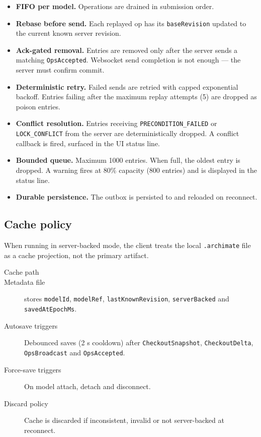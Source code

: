 \begin{itemize}
\item \textbf{FIFO per model.} Operations are drained in submission order.
\item \textbf{Rebase before send.} Each replayed op has its
  \texttt{baseRevision} updated to the current known server revision.
\item \textbf{Ack-gated removal.} Entries are removed only after the server
  sends a matching \texttt{OpsAccepted}. Websocket send completion is not
  enough --- the server must confirm commit.
\item \textbf{Deterministic retry.} Failed sends are retried with capped
  exponential backoff. Entries failing after the maximum replay attempts (5)
  are dropped as poison entries.
\item \textbf{Conflict resolution.} Entries receiving
  \texttt{PRECONDITION\_FAILED} or \texttt{LOCK\_CONFLICT} from the server
  are deterministically dropped. A conflict callback is fired, surfaced in
  the UI status line.
\item \textbf{Bounded queue.} Maximum 1000 entries. When full, the oldest
  entry is dropped. A warning fires at 80\% capacity (800 entries) and is
  displayed in the status line.
\item \textbf{Durable persistence.} The outbox is persisted to
  and reloaded on reconnect.
\end{itemize}

\subsection{Cache policy}

When running in server-backed mode, the client treats the local
\texttt{.archimate} file as a cache projection, not the primary artifact.

\begin{description}
\item[Cache path] 
\item[Metadata file]  stores
  \texttt{modelId}, \texttt{modelRef}, \texttt{lastKnownRevision},
  \texttt{serverBacked} and \texttt{savedAtEpochMs}.
\item[Autosave triggers] Debounced saves (2 s cooldown) after
  \texttt{CheckoutSnapshot}, \texttt{CheckoutDelta},
  \texttt{OpsBroadcast} and \texttt{OpsAccepted}.
\item[Force-save triggers] On model attach, detach and disconnect.
\item[Discard policy] Cache is discarded if inconsistent, invalid or not
  server-backed at reconnect.
\end{description}

